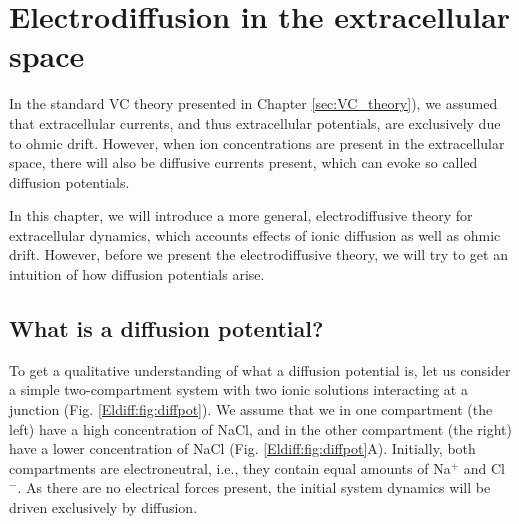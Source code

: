 \section{Electrodiffusion in the extracellular space}
\label{sec:eldiff}
In the standard VC theory presented in Chapter \ref{sec:VC_theory}), we assumed that extracellular currents, and thus extracellular potentials, are exclusively due to ohmic drift. However, when ion concentrations are present in the extracellular space, there will also be diffusive currents present, which can evoke so called diffusion potentials. 

In this chapter, we will introduce a more general, electrodiffusive theory for extracellular dynamics, which accounts effects of ionic diffusion as well as ohmic drift. However, before we present the electrodiffusive theory, we will try to get an intuition of how diffusion potentials arise.

\subsection{What is a diffusion potential?}
To get a qualitative understanding of what a diffusion potential is, let us consider a simple two-compartment system with two ionic solutions interacting at a junction  (Fig. \ref{Eldiff:fig:diffpot}). We assume that we in one compartment (the left) have a high concentration of NaCl, and in the other compartment (the right) have a lower concentration of NaCl (Fig. \ref{Eldiff:fig:diffpot}A). Initially, both compartments are electroneutral, i.e., they contain equal amounts of Na$^+$ and Cl$^-$. As there are no electrical forces present, the initial system dynamics will be driven exclusively by diffusion. 

